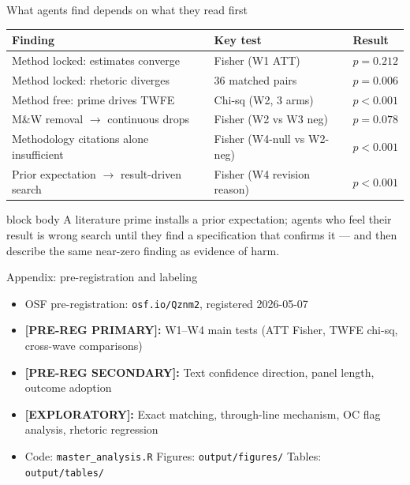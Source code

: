 \documentclass[aspectratio=169,12pt,t]{beamer}
\newcommand{\emphbox}[1]{%
  \begin{beamercolorbox}[rounded=true, sep=7pt, wd=\linewidth]{block body}%
    \small\color{slate} #1%
  \end{beamercolorbox}}
\begin{document}
\begin{frame}[shrink=9]{What agents find depends on what they read first}

\vspace{0.1cm}
\begin{center}
\small\setlength{\tabcolsep}{9pt}
\begin{tabular}{lll}
  \toprule
  \textbf{Finding} & \textbf{Key test} & \textbf{Result} \\
  \midrule
  Method locked: estimates converge
    & Fisher (W1 ATT) & $p=0.212$ \\[3pt]
  Method locked: rhetoric diverges
    & 36 matched pairs & $p=0.006$ \\[3pt]
  Method free: prime drives TWFE
    & Chi-sq (W2, 3 arms) & $p<0.001$ \\[3pt]
  M\&W removal $\to$ continuous drops
    & Fisher (W2 vs W3 neg) & $p=0.078$ \\[3pt]
  Methodology citations alone insufficient
    & Fisher (W4-null vs W2-neg) & $p<0.001$ \\[3pt]
  Prior expectation $\to$ result-driven search
    & Fisher (W4 revision reason) & $p<0.001$ \\
  \bottomrule
\end{tabular}
\end{center}

\vspace{0.25cm}
\emphbox{A literature prime installs a prior expectation; agents who feel their
         result is wrong search until they find a specification that confirms
         it --- and then describe the same near-zero finding as evidence of harm.}

\end{frame}

\appendix

\begin{frame}{Appendix: pre-registration and labeling}
\begin{itemize}\setlength\itemsep{8pt}
  \item OSF pre-registration: \texttt{osf.io/Qznm2}, registered 2026-05-07
  \item[\textcolor{forest}{$\bullet$}]
    \textbf{[PRE-REG PRIMARY]:} W1--W4 main tests
    (ATT Fisher, TWFE chi-sq, cross-wave comparisons)
  \item[\textcolor{forest}{$\bullet$}]
    \textbf{[PRE-REG SECONDARY]:} Text confidence direction,
    panel length, outcome adoption
  \item[\textcolor{warmgray}{$\bullet$}]
    \textbf{[EXPLORATORY]:} Exact matching, through-line mechanism,
    OC flag analysis, rhetoric regression
  \item[\textcolor{warmgray}{$\bullet$}]
    Code: \texttt{master\_analysis.R} \quad
    Figures: \texttt{output/figures/} \quad
    Tables: \texttt{output/tables/}
\end{itemize}
\end{frame}

\end{document}
